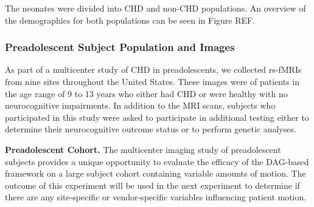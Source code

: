 

The neonates were divided into CHD and non-CHD populations. An overview of the demographics for both populations can be seen in Figure REF. %

\subsubsection{Preadolescent Subject Population and Images}

As part of a multicenter study of CHD in preadolescents, we collected rs-fMRIs from nine sites throughout the United States. These images were of patients in the age range of 9 to 13 years who either had CHD or were healthy with no neurocognitive impairments. In addition to the MRI scans, subjects who participated in this study were asked to participate in additional testing  either to determine their neurocognitive outcome status or to perform genetic analyses. %

\textbf{Preadolescent Cohort.} The multicenter imaging study of preadolescent subjects provides a unique opportunity to evaluate the efficacy of the DAG-based framework on a large subject cohort containing variable amounts of motion. The outcome of this experiment will be used in the next experiment to determine if there are any site-specific or vendor-specific variables influencing patient motion.


